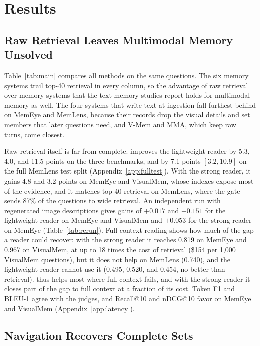 \section{Results}
\label{sec:results}

\subsection{Raw Retrieval Leaves Multimodal Memory Unsolved}
\label{sec:res-main}



Table~\ref{tab:main} compares all methods on the same questions. The six memory systems trail top-40 retrieval in every column, so the advantage of raw retrieval over memory systems that the text-memory studies report holds for multimodal memory as well. The four systems that write text at ingestion fall furthest behind on MemEye and MemLens, because their records drop the visual details and set members that later questions need, and V-Mem and MMA, which keep raw turns, come closest.

Raw retrieval itself is far from complete. \vgs{} improves the lightweight reader by 5.3, 4.0, and 11.5 points on the three benchmarks, and by 7.1 points $[3.2, 10.9]$ on the full MemLens test split (Appendix~\ref{app:fulltest}). With the strong reader, it gains 4.8 and 3.2 points on MemEye and VisualMem, whose indexes expose most of the evidence, and it matches top-40 retrieval on MemLens, where the gate sends 87\% of the questions to wide retrieval. An independent run with regenerated image descriptions gives gains of $+0.017$ and $+0.151$ for the lightweight reader on MemEye and VisualMem and $+0.053$ for the strong reader on MemEye (Table~\ref{tab:rerun}). Full-context reading shows how much of the gap a reader could recover: with the strong reader it reaches 0.819 on MemEye and 0.967 on VisualMem, at up to 18 times the cost of retrieval (\$154 per 1,000 VisualMem questions), but it does not help on MemLens (0.740), and the lightweight reader cannot use it (0.495, 0.520, and 0.454, no better than retrieval). \vgs{} thus helps most where full context fails, and with the strong reader it closes part of the gap to full context at a fraction of its cost. Token F1 and BLEU-1 agree with the judges, and Recall@10 and nDCG@10 favor \vgs{} on MemEye and VisualMem (Appendix~\ref{app:latency}).

\subsection{Navigation Recovers Complete Sets}
\label{sec:res-select}

